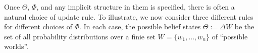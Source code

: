Once $\Theta$, $\Phi$, and any implicit structure in them is specified, there is often a natural choice of update rule.
To illustrate, we now consider three different rules for different choices of $\Phi$.
In each case, the possible belief states $\Theta := \Delta W$ be the set of all probability distributions over a finie set $W = \{w_1, \ldots, w_n\}$ of ``possible worlds''.

